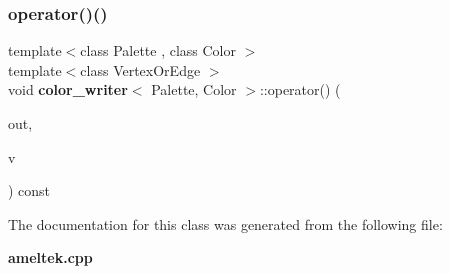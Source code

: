 \subsubsection{operator()()}
{\footnotesize\ttfamily template$<$class Palette , class Color $>$ \\
template$<$class Vertex\+Or\+Edge $>$ \\
void \textbf{ color\+\_\+writer}$<$ Palette, Color $>$\+::operator() (\begin{DoxyParamCaption}\item[{std\+::ostream \&}]{out,  }\item[{const Vertex\+Or\+Edge \&}]{v }\end{DoxyParamCaption}) const\hspace{0.3cm}{\ttfamily [inline]}}



The documentation for this class was generated from the following file\+:\begin{DoxyCompactItemize}
\item 
\textbf{ ameltek.\+cpp}\end{DoxyCompactItemize}
